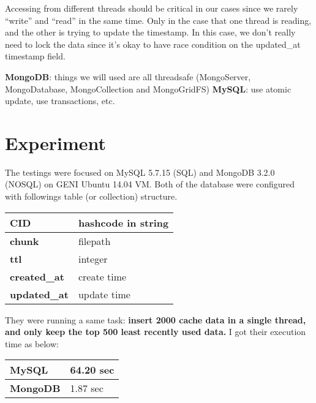 \documentclass[letterpaper, 10 pt, conference]{ieeeconf}
\begin{document}
Accessing from different threads should be critical in our cases since we rarely ``write'' and ``read'' in the same time. Only in the case that one thread is reading, and the other is trying to update the timestamp. In this case, we don't really need to lock the data since it's okay to have race condition on the updated\_at timestamp field.

{\bf MongoDB}: things we will used are all threadsafe (MongoServer, MongoDatabase, MongoCollection and MongoGridFS)\cite{mongo-thread} {\bf MySQL}: use atomic update, use transactions, etc.\cite{mysql-thread}

\section{Experiment}

The testings were focused on MySQL 5.7.15 (SQL) and MongoDB 3.2.0 (NOSQL) on GENI Ubuntu 14.04 VM. Both of the database were configured with followings table (or collection) structure.

\begin{table}[htbp]
\begin{center}
\begin{tabular}{|l|l|}
\hline
{\bf CID}     & hashcode in string \\ \hline
{\bf chunk}   & filepath \\ \hline
{\bf ttl}     & integer \\ \hline
{\bf created\_at} & create time \\ \hline
{\bf updated\_at} & update time \\ \hline
\end{tabular}
\end{center}
\end{table}


They were running a same task: {\bf insert 2000 cache data in a single thread, and only keep the top 500 least recently used data.} I got their execution time as below:

\begin{table}[htbp]
\begin{center}
\begin{tabular}{|l|l|}
\hline
{\bf MySQL}     & 64.20 sec \\ \hline
{\bf MongoDB}   & 1.87 sec \\ \hline
\end{tabular}
\end{center}
\end{table}
\end{document}
